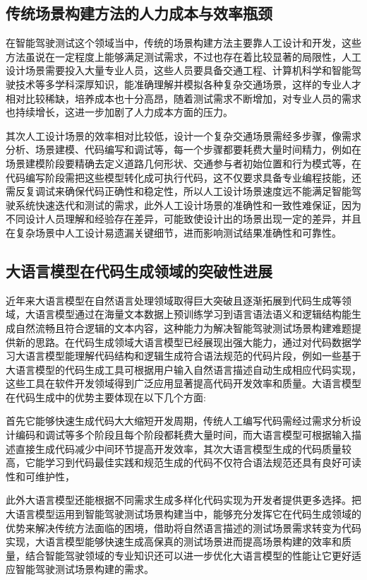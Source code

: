 \subsection{传统场景构建方法的人力成本与效率瓶颈}
在智能驾驶测试这个领域当中，传统的场景构建方法主要靠人工设计和开发\cite{cui2023chatlaw}，这些方法虽说在一定程度上能够满足测试需求，不过也存在着比较显著的局限性，人工设计场景需要投入大量专业人员，这些人员要具备交通工程、计算机科学和智能驾驶技术等多学科深厚知识，能准确理解并模拟各种复杂交通场景，这样的专业人才相对比较稀缺，培养成本也十分高昂，随着测试需求不断增加，对专业人员的需求也持续增长，这进一步加剧了人力成本方面的压力。

其次人工设计场景的效率相对比较低，设计一个复杂交通场景需经多步骤，像需求分析、场景建模、代码编写和调试等，每一个步骤都要耗费大量时间精力，例如在场景建模阶段要精确去定义道路几何形状、交通参与者初始位置和行为模式等，在代码编写阶段需把这些模型转化成可执行代码，这不仅要求具备专业编程技能，还需反复调试来确保代码正确性和稳定性，所以人工设计场景速度远不能满足智能驾驶系统快速迭代和测试的需求，此外人工设计场景的准确性和一致性难保证，因为不同设计人员理解和经验存在差异，可能致使设计出的场景出现一定的差异，并且在复杂场景中人工设计易遗漏关键细节，进而影响测试结果准确性和可靠性。

\subsection{大语言模型在代码生成领域的突破性进展}
近年来大语言模型在自然语言处理领域取得巨大突破且逐渐拓展到代码生成等领域，大语言模型通过在海量文本数据上预训练学习到语言语法语义和逻辑结构能生成自然流畅且符合逻辑的文本内容，这种能力为解决智能驾驶测试场景构建难题提供新的思路。在代码生成领域大语言模型已经展现出强大能力\cite{chowdhery2022palm}，通过对代码数据学习大语言模型能理解代码结构和逻辑生成符合语法规范的代码片段，例如一些基于大语言模型的代码生成工具可根据用户输入自然语言描述自动生成相应代码实现，这些工具在软件开发领域得到广泛应用显著提高代码开发效率和质量。大语言模型在代码生成中的优势主要体现在以下几个方面:

首先它能够快速生成代码大大缩短开发周期，传统人工编写代码需经过需求分析设计编码和调试等多个阶段且每个阶段都耗费大量时间，而大语言模型可根据输入描述直接生成代码减少中间环节提高开发效率\cite{feng2021intelligent}，其次大语言模型生成的代码质量较高，它能学习到代码最佳实践和规范生成的代码不仅符合语法规范还具有良好可读性和可维护性，

此外大语言模型还能根据不同需求生成多样化代码实现为开发者提供更多选择。把大语言模型运用到智能驾驶测试场景构建当中\cite{kong2020physgan}，能够充分发挥它在代码生成领域的优势来解决传统方法面临的困境，借助将自然语言描述的测试场景需求转变为代码实现，大语言模型能够快速生成高保真的测试场景进而提高场景构建的效率和质量，结合智能驾驶领域的专业知识还可以进一步优化大语言模型的性能让它更好适应智能驾驶测试场景构建的需求。




